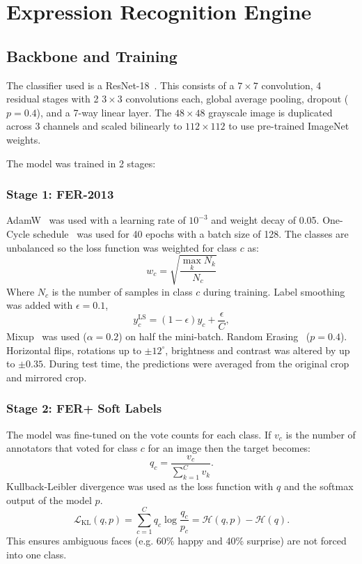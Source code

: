\documentclass[conference]{IEEEtran}
\begin{document}
\section{Expression Recognition Engine}
\subsection{Backbone and Training}
The classifier used is a ResNet-18~\cite{he}. This consists of a $7\times7$ convolution, 4 residual stages with 2 $3\times3$ convolutions each, global average pooling, dropout ($p=0.4$), and a 7-way linear layer. The $48\times48$ grayscale image is duplicated across 3 channels and scaled bilinearly to $112\times112$ to use pre-trained ImageNet weights.

The model was trained in 2 stages:

\subsubsection{Stage 1: FER-2013}
AdamW~\cite{adamw} was used with a learning rate of $10^{-3}$ and weight decay of 0.05. One-Cycle schedule~\cite{onecycle} was used for 40 epochs with a batch size of 128. The classes are unbalanced so the loss function was weighted for class $c$ as:
\begin{equation}
w_c = \sqrt{\frac{\max_{k} N_k}{N_c}}
\end{equation}
Where $N_c$ is the number of samples in class $c$ during training. Label smoothing~\cite{labelsmooth} was added with $\epsilon = 0.1$,
\begin{equation}
y_c^{\text{LS}} = (1 - \epsilon) y_c + \frac{\epsilon}{C},
\end{equation}
Mixup~\cite{mixup} was used ($\alpha = 0.2$) on half the mini-batch. Random Erasing~\cite{erasing} ($p=0.4$). Horizontal flips, rotations up to $\pm 12^\circ$, brightness and contrast was altered by up to $\pm 0.35$. During test time, the predictions were averaged from the original crop and mirrored crop.

\subsubsection{Stage 2: FER+ Soft Labels}
The model was fine-tuned on the vote counts for each class. If $v_c$ is the number of annotators that voted for class $c$ for an image then the target becomes:
\begin{equation}
q_c = \frac{v_c}{\sum_{k=1}^C v_k}.
\end{equation}
Kullback-Leibler divergence was used as the loss function with $q$ and the softmax output of the model $p$.
\begin{equation}
\mathcal{L}_{\text{KL}}(q, p) = \sum_{c=1}^C q_c \log \frac{q_c}{p_c} = \mathcal{H}(q, p) - \mathcal{H}(q).
\end{equation}
This ensures ambiguous faces (e.g. 60\% happy and 40\% surprise) are not forced into one class.
\end{document}

